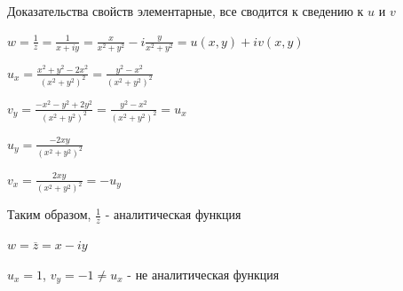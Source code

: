 \Nota Доказательства свойств элементарные, все сводится к сведению к $u$ и $v$

\Ex $w = \frac{1}{z} = \frac{1}{x + iy} = \frac{x}{x^2 + y^2} - i \frac{y}{x^2 + y^2} = u(x, y) + i v(x, y)$

$u_x = \frac{x^2 + y^2 - 2x^2}{(x^2 + y^2)^2} = \frac{y^2 - x^2}{(x^2 + y^2)^2}$

$v_y = \frac{-x^2 - y^2 + 2y^2}{(x^2 + y^2)^2} = \frac{y^2 - x^2}{(x^2 + y^2)^2} = u_x$

$u_y = \frac{-2xy}{(x^2 + y^2)^2}$

$v_x = \frac{2xy}{(x^2 + y^2)^2} = -u_y$

Таким образом, $\frac{1}{z}$ - аналитическая функция

\Ex $w = \overline{z} = x - iy$

$u_x = 1$, $v_y = -1 \neq u_x$ - не аналитическая функция


